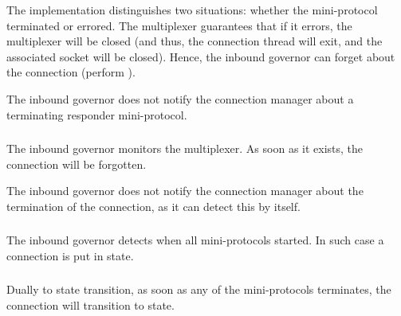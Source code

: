 \begin{detail}
  The implementation distinguishes two situations: whether the mini-protocol
  terminated or errored.  The multiplexer guarantees that if it errors, the
  multiplexer will be closed (and thus, the connection thread will exit, and the
  associated socket will be closed).   Hence, the inbound governor can forget about the
  connection
  (perform \MuxTerminated{}).

  The inbound governor does not notify the connection manager about a terminating
  responder mini-protocol.
\end{detail}

\subsubsection{\MuxTerminated}
The inbound governor monitors the multiplexer.  As soon as it exists, the
connection will be forgotten.

The inbound governor does not notify the connection manager about the
termination of the connection, as it can detect this by itself.

\subsubsection{\PromotedToHotRemote}
The inbound governor detects when all \hot{} mini-protocols started.   In such
case a \RemoteWarm{} connection is put in \RemoteHot{} state.

\subsubsection{\DemotedToWarmRemote}
Dually to \PromotedToHotRemote{} state transition, as soon as any of the \hot{}
mini-protocols terminates, the connection will transition to \RemoteWarm{}
state.
